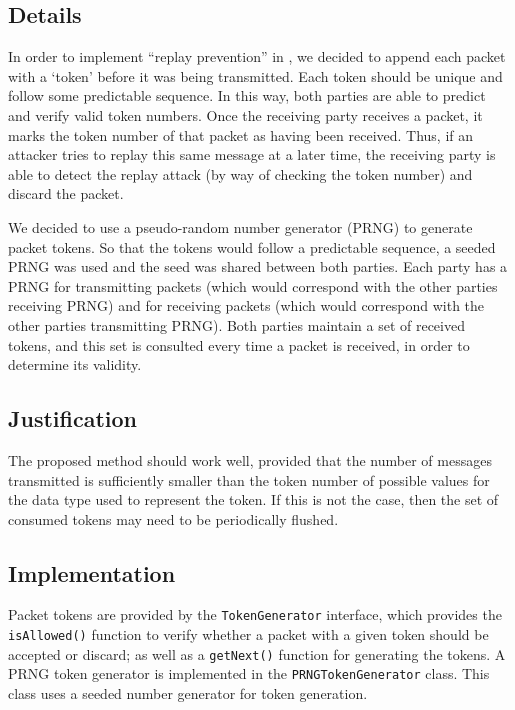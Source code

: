 \documentclass[a4paper,11pt]{article}
\begin{document}
\subsection{Details}
In order to implement ``replay prevention'' in \packageName{}, we decided to 
append each packet with a `token' before it was being transmitted. Each token 
should be unique and follow some predictable sequence. In this way, both parties
are able to predict and verify valid token numbers. Once the receiving party 
receives a packet, it marks the token number of that packet as having been 
received. Thus, if an attacker tries to replay this same message at a later 
time, the receiving party is able to detect the replay attack (by way of
checking the token number) and discard the packet.

We decided to use a pseudo-random number generator (PRNG) to generate packet 
tokens. So that the tokens would follow a predictable sequence, a seeded PRNG
was used and the seed was shared between both parties. Each party has a PRNG for
transmitting packets (which would correspond with the other parties receiving 
PRNG) and for receiving packets (which would correspond with the other parties 
transmitting PRNG). Both parties maintain a set of received tokens, and this 
set is consulted every time a packet is received, in order to determine its
validity.

\subsection{Justification}
The proposed method should work well, provided that the number of messages 
transmitted is sufficiently smaller than the token number of possible values for
the data type used to represent the token. If this is not the case, then the 
set of consumed tokens may need to be periodically flushed.

\subsection{Implementation}
Packet tokens are provided by the \verb+TokenGenerator+ interface, which 
provides the \verb+isAllowed()+ function to verify whether a packet with a given
token should be accepted or discard; as well as a \verb+getNext()+ function for
generating the tokens. A PRNG token generator is implemented in the 
\verb+PRNGTokenGenerator+ class. This class uses a seeded number generator for
token generation.

\end{document}
